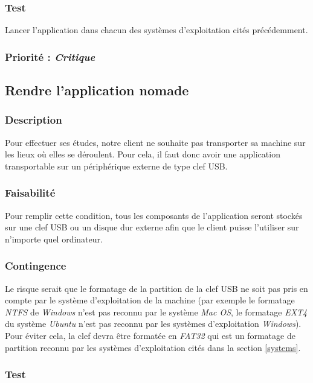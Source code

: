 \documentclass[a4paper,twoside,10pt]{report}
\begin{document}
\subsubsection{Test}

Lancer l'application dans chacun des systèmes d’exploitation cités précédemment.

\subsubsection{Priorité : \textit{Critique}}

\subsection{Rendre l’application nomade}\label{nomadite}

\subsubsection{Description}
Pour effectuer ses études, notre client ne souhaite pas transporter sa machine sur les lieux où elles se déroulent. Pour cela, il faut donc avoir une application transportable sur un périphérique externe de type clef USB.

\subsubsection{Faisabilité}

Pour remplir cette condition, tous les composants de l’application seront stockés sur une clef USB ou un disque dur externe afin que le client puisse l'utiliser sur n’importe quel ordinateur.


\subsubsection{Contingence}

Le risque serait que le formatage de la partition de la clef USB ne soit pas pris en compte par le système d’exploitation de la machine (par exemple le formatage \textit{NTFS} de \textit{Windows} n’est pas reconnu par le système \textit{Mac OS}, le formatage \textit{EXT4} du système \textit{Ubuntu} n’est pas reconnu par les systèmes d’exploitation \textit{Windows}). Pour éviter cela, la clef devra être formatée en \textit{FAT32} qui est un formatage de partition reconnu par les systèmes d’exploitation cités dans la section \ref{systems}.

\subsubsection{Test}
\end{document}
